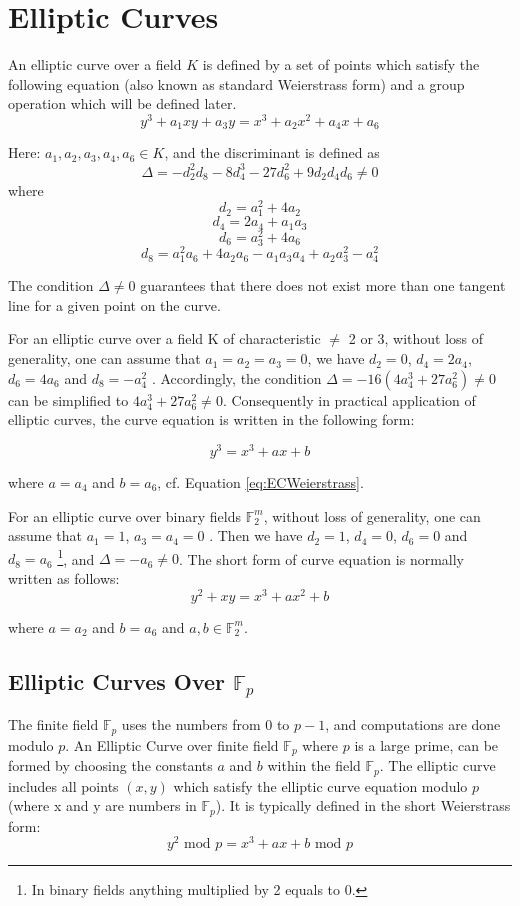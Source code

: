 \section{Elliptic Curves} \label{sec:EC}
An elliptic curve over a field $K$ is defined by a set of points which satisfy the following equation (also known as standard Weierstrass form) and a group operation which will be defined later.
\begin{equation} \label{eq:ECWeierstrass}
y^3+a_1xy+a_3y = x^3 + a_2x^2+a_4x+a_6
\end{equation}

Here: $a_1,a_2,a_3,a_4,a_6 \in K$, and the discriminant is defined as
 $$\Delta=-d^{2}_{2}d_{8}-8d_{4}^{3}-27d_{6}^{2}+9d_{2}d_{4}d_{6} \neq 0$$
where  
$$d_{2}=a_{1}^{2}+4a_{2}$$  $$d_{4}=2a_{4}+a_1a_3$$  $$d_6=a_{3}^{2}+4a_6$$  $$d_8=a_{1}^{2}a_6+4a_2a_6-a_1a_3a_4+a_2a_{3}^{2}-a_{4}^{2}$$

The condition $\Delta \neq 0$ guarantees that there does not exist more than one tangent line for a given point on the curve.

For an elliptic curve over a field K of characteristic $\neq$ 2 or 3, without loss of generality, one can assume that $a_1=a_2=a_3=0$, we have $d_2=0$, $d_4=2a_4$, $d_6 = 4a_6$ and $d_8=-a_{4}^{2}$ \cite{hankerson2006guide}. Accordingly, the condition $\Delta = -16(4a_4^3+27a_6^2) \neq 0$ can be simplified to $4a_4^3+27a_6^2 \neq 0$. Consequently in practical application of elliptic curves, the curve equation is written in the following form:

\begin{equation} \label{eq:ECFp}
y^3=x^3+ax+b
\end{equation}

where $a=a_4$ and $b=a_6$, cf. Equation \ref{eq:ECWeierstrass}.

For an elliptic curve over binary fields $\mathbb{F}_2^m$, without loss of generality, one can assume that $a_1=1$, $a_3=a_4=0$ \cite{hankerson2006guide}. Then we have $d_2=1$, $d_4=0$, $d_6=0$ and $d_8=a_6$ \footnote{In binary fields anything multiplied by 2 equals to 0.}, and $\Delta = -a_6 \neq 0$. The short form of curve equation is normally written as follows: 
\begin{equation}\label{eq:ECF2m}
y^2+xy=x^3+ax^2+b
\end{equation}

where $ a = a_2$ and $b = a_6$ and $a,b \in \mathbb{F}_2^m$. 

\subsection{Elliptic Curves Over $\mathbb{F}_p$}
The finite field $\mathbb{F}_p$ uses the numbers from 0 to $p-1$, and computations are done modulo $p$. An Elliptic Curve over finite field $\mathbb{F}_p$ where $p$ is a large prime, can be formed by choosing the constants $a$ and $b$ within the field $\mathbb{F}_p$. The elliptic curve includes all points $(x,y)$ which satisfy the elliptic curve equation modulo $p$ (where x and y are numbers in $\mathbb{F}_p$). It is typically defined in the short Weierstrass form:
$$y^2 \text{ mod } p= x^3 + ax + b \text{ mod } p$$


